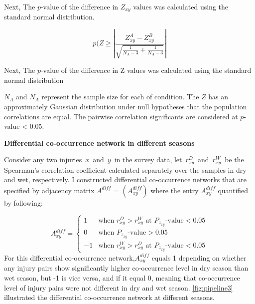 Next, The $p$-value of the difference in $Z_{xy}$ values was calculated using the standard normal distribution.

\begin{equation}
\label{eq:pofz}
p(Z\geq \left | \frac{Z_{xy}^A - Z_{xy}^B}{\sqrt{\frac{1}{N_{A}-3}+ \frac{1}{N_{A}-3}}} \right |
\end{equation}

Next, The $p$-value of the difference in Z values was calculated using the standard normal distribution

$N_{A}$ and $N_{A}$ represent the sample size for each of condition. The $Z$ has an approximately Gaussian distribution under null hypotheses that the population correlations are equal. The pairwise correlation significants are considered at $p$-value < 0.05.

\textbf{Differential co-occurrence network in different seasons}

Consider any two injuries $x$ and $y$ in the survey data, let $r_{xy}^D$ and $r_{xy}^W$ be the Spearman’s correlation coefficient calculated separately over the samples in dry and wet, respectively. I constructed differential co-occurrence networks that are specified by adjacency matrix $A^{diff}$ = $(A_{xy}^{diff})$ where the entry $A_{xy}^{diff}$ quantified by following:   


\begin{equation}
A_{xy}^{diff} = \left\{\begin{matrix}
 1 & \text{when } r_{xy}^D > r_{xy}^W \text{ at } P_{z_{xy}} \text{-value}  < 0.05  \\ 
 0 & \text{when } P_{z_{xy}}  \text{-value}  > 0.05                              \\ -1 & \text{when } r_{xy}^W > r_{xy}^D \text{ at } P_{z_{xy}} \text{-value}  < 0.05 \end{matrix}\right.\end{equation}
For  this differential co-occurrence network,$A_{xy}^{diff}$ equals 1 depending on whether any injury pairs show significantly higher co-occurrence level in dry season than wet season, but -1 is vice versa, and if it equal 0, meaning that co-occurrence level of injury pairs were not different in dry and wet season. \ref{fig:pipeline3} illustrated the differential co-occurrence network at different seasons.

